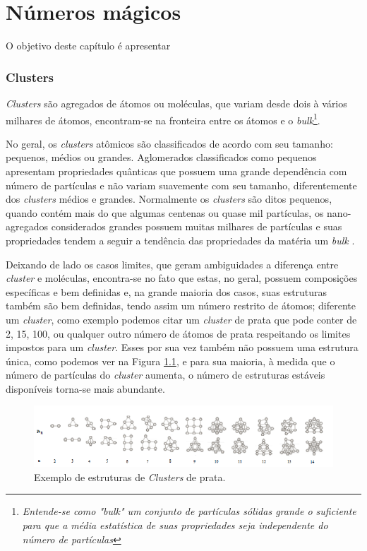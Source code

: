 \chapter{Números mágicos}
\label{c2}

O objetivo deste capítulo é apresentar

\subsection{Clusters}

\textit{Clusters} são agregados de átomos ou moléculas, que variam desde dois à vários milhares de átomos, encontram-se na fronteira entre os átomos e o \textit{bulk}\footnote{\textit{Entende-se como "bulk" um conjunto de partículas sólidas grande o suficiente para que a média estatística de suas propriedades seja independente do número de partículas\cite{bulk}}}\cite{Heer,Brack}. 

No geral, os \textit{clusters} atômicos são classificados de acordo com seu tamanho: pequenos, médios ou grandes. Aglomerados classificados como pequenos apresentam propriedades quânticas que possuem uma grande dependência com número de partículas e não variam suavemente com seu tamanho, diferentemente dos \textit{clusters} médios e grandes. Normalmente os \textit{clusters} são ditos pequenos, quando contém mais do que algumas centenas ou quase mil partículas, os nano-agregados considerados grandes possuem muitas milhares de partículas e suas propriedades tendem a seguir a tendência das propriedades da matéria um \textit{bulk} \cite{livro_cluster}.

Deixando de lado os casos limites, que geram ambiguidades a diferença entre \textit{cluster} e moléculas, encontra-se no fato que estas, no geral, possuem composições específicas e bem definidas e, na grande maioria dos casos, suas estruturas também são bem definidas, tendo  assim um número restrito de átomos; diferente um \textit{cluster}, como exemplo podemos citar um \textit{cluster} de prata que pode conter de 2, 15, 100, ou qualquer outro número de átomos de prata respeitando os limites impostos para um \textit{cluster}. Esses por sua vez também não possuem uma estrutura única, como podemos ver na Figura \ref{fig:estrutura_cluster_ag}, e para sua maioria, à medida que o número de partículas do \textit{cluster} aumenta, o número de estruturas estáveis disponíveis torna-se mais abundante. 

\begin{figure}
  \centering
  \includegraphics[width=1\textwidth]{images/estrutura_cluster_ag}
  \caption{ Exemplo de estruturas de \textit{Clusters} de prata.\cite{dissertacao_anderson}  }
  \label{fig:estrutura_cluster_ag}
\end{figure}


